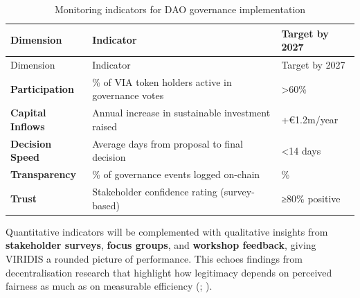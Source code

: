 \documentclass[
  english,
  12pt,
  oneside,
  open=any]{scrbook}
\begin{document}
\begin{longtable}[]{@{}
  >{\raggedright\arraybackslash}p{}
  >{\raggedright\arraybackslash}p{}
  >{\raggedright\arraybackslash}p{}@{}}
\caption{Monitoring indicators for DAO governance
implementation}\label{tbl-kpis}\tabularnewline
\toprule\noalign{}
\begin{minipage}[b]{\linewidth}\raggedright
Dimension
\end{minipage} & \begin{minipage}[b]{\linewidth}\raggedright
Indicator
\end{minipage} & \begin{minipage}[b]{\linewidth}\raggedright
Target by 2027
\end{minipage} \\
\midrule\noalign{}
\endfirsthead
\toprule\noalign{}
\begin{minipage}[b]{\linewidth}\raggedright
Dimension
\end{minipage} & \begin{minipage}[b]{\linewidth}\raggedright
Indicator
\end{minipage} & \begin{minipage}[b]{\linewidth}\raggedright
Target by 2027
\end{minipage} \\
\midrule\noalign{}
\endhead
\bottomrule\noalign{}
\endlastfoot
\textbf{Participation} & \% of VIA token holders active in governance
votes & \textgreater60\% \\
\textbf{Capital Inflows} & Annual increase in sustainable investment
raised & +€1.2m/year \\
\textbf{Decision Speed} & Average days from proposal to final decision &
\textless14 days \\
\textbf{Transparency} & \% of governance events logged on-chain &
100\% \\
\textbf{Trust} & Stakeholder confidence rating (survey-based) & ≥80\%
positive \\
\end{longtable}

Quantitative indicators will be complemented with qualitative insights
from \textbf{stakeholder surveys}, \textbf{focus groups}, and
\textbf{workshop feedback}, giving VIRIDIS a rounded picture of
performance. This echoes findings from decentralisation research that
highlight how legitimacy depends on perceived fairness as much as on
measurable efficiency (; ).
\end{document}
